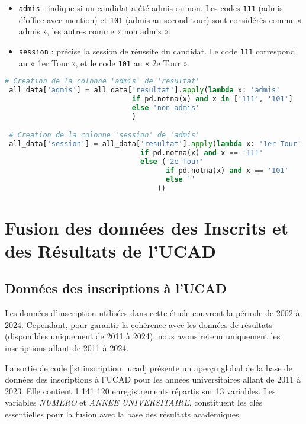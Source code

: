 \begin{itemize}
    \item \texttt{admis} : indique si un candidat a été admis ou non. Les codes \texttt{111} (admis d’office avec mention) et \texttt{101} (admis au second tour) sont considérés comme « admis », les autres comme « non admis ».
    \item \texttt{session} : précise la session de réussite du candidat. Le code \texttt{111} correspond au « 1er Tour », et le code \texttt{101} au « 2e Tour ».
\end{itemize}

\begin{lstlisting}[language=Python,
    caption=Création de nouvelles colonnes,
    label=lst:creation_colonnes,
    basicstyle=\ttfamily\small,
    backgroundcolor=\color{gray!10}
]
 # Creation de la colonne 'admis' de 'resultat'
 all_data['admis'] = all_data['resultat'].apply(lambda x: 'admis' 
                              if pd.notna(x) and x in ['111', '101'] 
                              else 'non admis'
                              )

 # Creation de la colonne 'session' de 'admis'
 all_data['session'] = all_data['resultat'].apply(lambda x: '1er Tour' 
                                if pd.notna(x) and x == '111' 
                                else ('2e Tour' 
                                      if pd.notna(x) and x == '101' 
                                      else ''
                                    ))
\end{lstlisting}

\section{Fusion des données des Inscrits et des Résultats de l’UCAD}

\subsection{Données des inscriptions à l’UCAD}

Les données d’inscription utilisées dans cette étude couvrent la période de 2002 à 2024. 
Cependant, pour garantir la cohérence avec les données de résultats (disponibles uniquement de 2011 à 2024), 
nous avons retenu uniquement les inscriptions allant de 2011 à 2024.

La sortie de code \ref{lst:inscription_ucad} présente un aperçu global de la base de données des inscriptions à l’UCAD pour les années universitaires allant de 2011 à 2023. 
Elle contient 1 141 120 enregistrements répartis sur 13 variables. 
Les variables \textit{NUMERO} et \textit{ANNEE UNIVERSITAIRE}, constituent les clés essentielles pour la fusion avec la base des résultats académiques.


